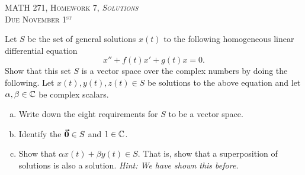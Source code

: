 \documentclass[12pt]{article} %
\begin{document}
\begin{center}
   \textsc{\large MATH 271, Homework 7, \emph{Solutions}}\\
   \textsc{Due November 1$^\textrm{st}$}
\end{center}
\vspace{.5cm}

\begin{problem}
Let $S$ be the set of general solutions $x(t)$ to the following homogeneous linear differential equation 
\[
x''+f(t)x'+g(t)x=0.
\]
Show that this set $S$ is a vector space over the complex numbers by doing the following. Let $x(t),y(t),z(t) \in S$ be solutions to the above equation and let $\alpha, \beta \in \mathbb{C}$ be complex scalars.
\begin{enumerate}[(a)]
    \item Write down the eight requirements for $S$ to be a vector space.  
    \item Identify the $\boldsymbol{\vec{0}} \in S$ and $1\in \mathbb{C}$. 
    \item Show that $\alpha x(t) + \beta y(t) \in S$. That is, show that a superposition of solutions is also a solution. \emph{Hint: We have shown this before.}
\end{enumerate}
\end{problem}
\end{document}
